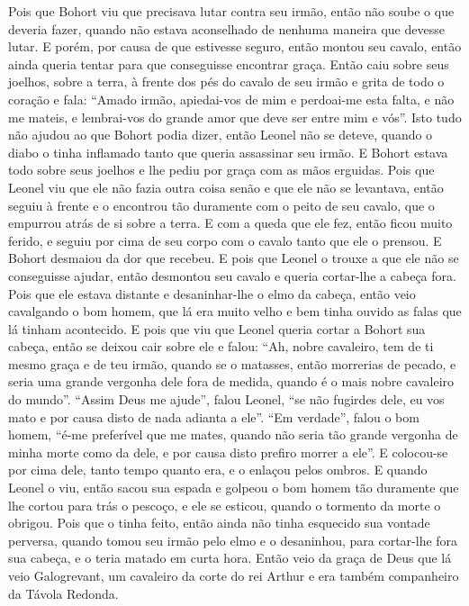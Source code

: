 Pois que Bohort viu que precisava lutar contra seu irmão, então não soube o que
deveria fazer, quando não estava aconselhado de nenhuma maneira que devesse
lutar. E porém, por causa de que estivesse seguro, então montou seu cavalo,
então ainda queria tentar para que conseguisse encontrar graça. Então caiu
sobre seus joelhos, sobre a terra, à frente dos pés do cavalo de seu irmão e
grita de todo o coração e fala: “Amado irmão, apiedai-vos de mim e perdoai-me
esta falta, e não me mateis, e lembrai-vos do grande amor que deve ser entre
mim e vós”. Isto tudo não ajudou ao que Bohort podia dizer, então Leonel não se
deteve, quando o diabo o tinha inflamado tanto que queria assassinar seu irmão. 
E Bohort estava todo sobre seus joelhos e lhe pediu por graça com as
mãos erguidas. Pois que Leonel viu que ele não fazia outra coisa senão e que
ele não se levantava, então seguiu à frente e o encontrou tão duramente com o
peito de seu cavalo, que o empurrou atrás de si sobre a terra. E com a queda
que ele fez, então ficou muito ferido, e seguiu por cima de seu corpo com o
cavalo tanto que ele o prensou. E Bohort desmaiou da dor que recebeu. E pois
que Leonel o trouxe a que ele não se conseguisse ajudar, então desmontou seu
cavalo e queria cortar-lhe a cabeça fora. Pois que ele estava distante e
desaninhar-lhe o elmo da cabeça, então veio cavalgando o bom homem, que lá era
muito velho e bem tinha ouvido as falas que lá tinham acontecido. E pois que
viu que Leonel queria cortar a Bohort sua cabeça, então se deixou cair sobre
ele e falou: “Ah, nobre cavaleiro, tem de ti mesmo graça e de teu irmão, quando
se o matasses, então morrerias de pecado, e seria uma grande vergonha dele fora
de medida, quando é o mais nobre cavaleiro do mundo”. “Assim Deus me
ajude”, falou Leonel, “se não fugirdes dele, eu vos mato e por causa disto de
nada adianta a ele”. “Em verdade”, falou o bom homem, “é-me preferível que me
mates, quando não seria tão grande vergonha de minha morte como da dele, e por
causa disto prefiro morrer a ele”. E colocou-se por cima dele, tanto tempo
quanto era, e o enlaçou pelos ombros. E quando Leonel o viu, então sacou sua
espada e golpeou o bom homem tão duramente que lhe cortou para trás o pescoço,
e ele se esticou, quando o tormento da morte o obrigou. Pois que o tinha feito,
então ainda não tinha esquecido sua vontade perversa, quando tomou seu irmão
pelo elmo e o desaninhou, para cortar-lhe fora sua cabeça, e o teria matado em
curta hora. Então veio da graça de Deus que lá veio Galogrevant, um cavaleiro
da corte do rei Arthur e era também companheiro da Távola Redonda.
